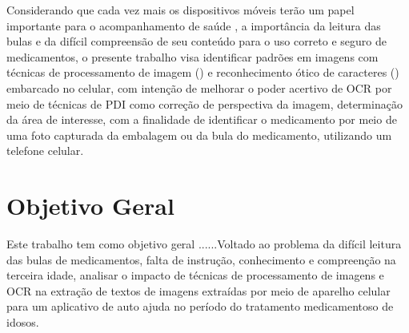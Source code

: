 
Considerando que cada vez mais os dispositivos móveis terão um papel importante para o acompanhamento de saúde \cite{ESTADAOCELULAR}, a importância da leitura das bulas e da difícil compreensão de seu conteúdo para o uso correto e seguro de medicamentos, o presente trabalho visa identificar padrões em imagens com técnicas de processamento de imagem () e reconhecimento ótico de caracteres () embarcado no celular, com intenção de melhorar o poder acertivo de OCR por meio de técnicas de PDI como correção de perspectiva da imagem, determinação da área de interesse, com a finalidade de identificar o medicamento por meio de uma foto capturada da embalagem ou da bula do medicamento, utilizando um telefone celular.




\section{Objetivo Geral}

Este trabalho tem como objetivo geral ......Voltado ao problema da difícil leitura das bulas de medicamentos, falta de instrução, conhecimento e compreenção na terceira idade, analisar o impacto de técnicas de processamento de imagens e OCR na extração de textos de imagens extraídas por meio de aparelho celular para um aplicativo de auto ajuda no período do tratamento medicamentoso de idosos.




